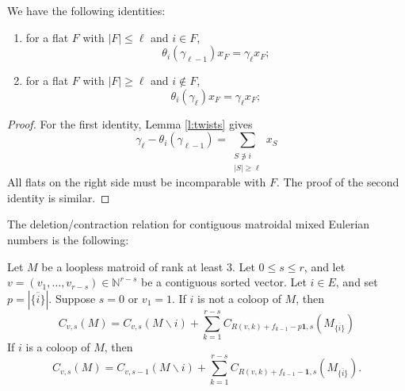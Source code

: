\documentclass[ALCO,published]{cedram}
\numberwithin{equation}{section}
\numberwithin{figure}{section}
\newcommand{\N}{\mathbb{N}}
\begin{document}
\begin{lemma} \label{l:comparewiththeta} We have the following identities:
\begin{enumerate}
    \item for a flat $F$ with $|F|\leq \ell$ and $i\in F$,
\[\theta_i(\gamma_{\ell-1})x_F=\gamma_{\ell}x_F;\]
    \item for a flat $F$ with $|F|\geq \ell$ and $i\not\in F$,
\[\theta_i(\gamma_{\ell})x_F=\gamma_{\ell}x_F;\]
\end{enumerate}
\end{lemma}

\begin{proof}
    For the first identity, Lemma \ref{l:twists} gives
    \[\gamma_\ell-\theta_i(\gamma_{\ell-1})=\sum_{\substack{S\not\ni i\\|S|\geq \ell}} x_S\]
    All flats on the right side must be incomparable with $F$. The proof of the second identity is similar.
\end{proof}

The deletion/contraction relation for contiguous matroidal mixed Eulerian numbers is the following:
\begin{prop} \label{p:contiguousdc} Let $M$ be a loopless matroid of rank at least $3$. Let $0\leq s\leq r$, and let $v=(v_1,\dots,v_{r-s})\in \N^{r-s}$ be a contiguous sorted vector. Let $i\in E$, and set $p=|\overline{\{i\}}|$. Suppose $s=0$ or $v_1=1$.
If  $i$ is not a coloop of $M$, then
\[C_{v,s}(M)=
C_{v,s}(M\backslash i)+\sum_{k=1}^{r-s} C_{R(v,k)+f_{k-1}-p\mathbf{1},s}(M_{\overline{\{i\}}}) 
\]
If $i$ is a coloop of $M$, then 
\[C_{v,s}(M)=C_{v,s-1}(M\backslash i)+\sum_{k=1}^{r-s} C_{R(v,k)+f_{k-1}-\mathbf{1},s}(M_{\overline{\{i\}}}).
\]
\end{prop}
\end{document}
